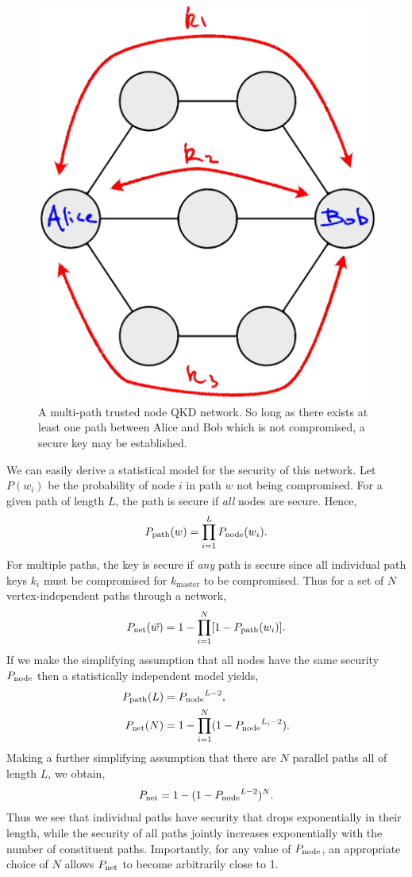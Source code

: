 \begin{figure}[!htb]
	\centering
	\includegraphics[width=0.6\columnwidth]{figures/Trusted_node_multipath}
	\caption{A multi-path trusted node QKD network. So long as there exists at least one path between Alice and Bob which is not compromised, a secure key may be established.} \label{fig:multi_path}
\end{figure}

We can easily derive a statistical model for the security of this network. Let $P(w_i)$ be the probability of node $i$ in path $w$ not being compromised. For a given path of length $L$, the path is secure if \emph{all} nodes are secure. Hence,
\begin{align}
	P_{\rm path}(w) = \prod_{i=1}^L P_{\rm node}(w_i).
\end{align}
For multiple paths, the key is secure if \emph{any} path is secure since all individual path keys $k_i$ must be compromised for $k_\mathrm{master}$ to be compromised. Thus for a set of $N$ vertex-independent paths through a network,
\begin{align}
	P_{\rm net}(\vec{w}) = 1-\prod_{i=1}^N [1-P_{\rm path}(w_i)].
\end{align}
If we make the simplifying assumption that all nodes have the same security $P_{\rm node}$ then a statistically independent model yields,
\begin{align}
	P_{\rm path}(L) &= {P_{\rm node}}^{L-2},\nonumber\\
	P_{\rm net}(N) &= 1-\prod_{i=1}^N (1-{P_{\rm node}}^{L_i-2}).
\end{align}
Making a further simplifying assumption that there are $N$ parallel paths all of length $L$, we obtain,
\begin{align}
	P_{\rm net} = 1-(1-{P_{\rm node}}^{L-2})^N.
\end{align}
Thus we see that individual paths have security that drops exponentially in their length, while the security of all paths jointly increases exponentially with the number of constituent paths. Importantly, for any value of $P_{\rm node}$, an appropriate choice of $N$ allows $P_{\rm net}$ to become arbitrarily close to 1.

